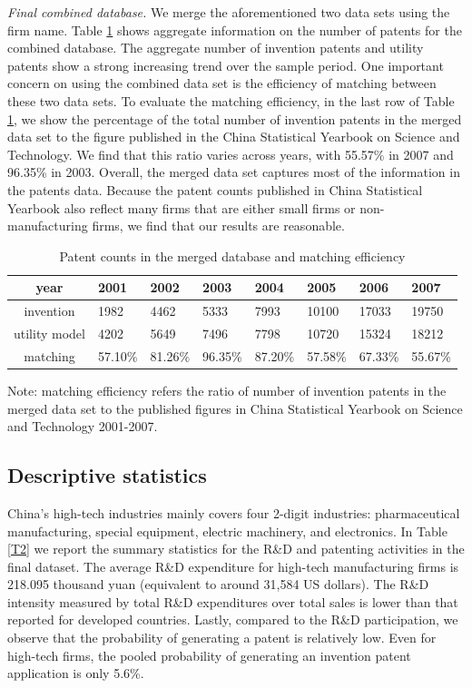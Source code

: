 \documentclass[11pt]{article}
\begin{document}
\textit{Final combined database.}
We merge the aforementioned two data sets using the
firm name. Table \ref{T1} shows aggregate information on the number of patents for the combined database. The aggregate number of invention patents and utility patents show a strong increasing trend over the sample period. One important concern on using the combined data set is the
efficiency of matching between these two data sets. To evaluate the
matching efficiency, in the last row of Table \ref{T1}, we show the percentage of the total number of invention patents in the merged data set to
the figure published in the China Statistical Yearbook on Science
and Technology. We find that this ratio varies across years, with
55.57\% in 2007 and 96.35\% in 2003. Overall, the merged data set captures most of the information in the patents data. Because the patent counts published in China Statistical Yearbook also reflect many firms that are either small firms or non-manufacturing firms, we find that our results are reasonable. 

\begin{table}[h]
    \caption{Patent counts in the merged database and matching efficiency}
    \label{T1}
    \begin{centering}
    \begin{tabular}{clllllll}
    \toprule
    year & 2001 & 2002 & 2003 & 2004 & 2005 & 2006 & 2007\\
    \hline
    invention & 1982 & 4462 & 5333 & 7993 & 10100 & 17033 & 19750 \\
    utility model & 4202 & 5649 & 7496 & 7798 & 10720 & 15324 & 18212\\
    \hline
    matching  & 57.10\% & 81.26\% & 96.35\% & 87.20\% & 57.58\% & 67.33\% & 55.67\% \\
    \bottomrule
    \end{tabular}
    \par\end{centering}
    {\small{}Note: matching efficiency refers the ratio of number of invention patents in the merged data set to the published figures in China Statistical
    Yearbook on Science and Technology 2001-2007.}{\small \par}
\end{table}

\subsection{Descriptive statistics}
China's high-tech industries mainly covers four 2-digit industries: pharmaceutical manufacturing, special equipment, electric machinery, and electronics. In Table \ref{T2} we report the summary statistics for the R\&D and patenting activities in the final dataset. The average R\&D expenditure for high-tech manufacturing firms is 218.095 thousand yuan (equivalent to around 31,584 US dollars). The R\&D intensity measured by total R\&D expenditures over total sales is lower than that reported for developed countries. Lastly, compared to the R\&D participation, we observe that the probability of generating a patent is relatively low. Even for high-tech firms, the pooled probability of generating an invention patent application is only 5.6\%.  
\end{document}
